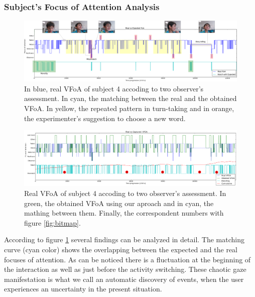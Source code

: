 \documentclass{sig-alternate}
\begin{document}
\subsubsection{Subject's Focus of Attention Analysis}

\begin{figure}
    \centering
    \includegraphics[width=1.8\columnwidth]{realExpected}
    \caption{\small In blue, real VFoA of subject 4 accoding to two observer's
    assessment. In cyan, the matching between the real and the obtained VFoA. In
    yellow, the repeated pattern in turn-taking and in orange, the experimenter's
    suggestion to choose a new word.}

    \label{fig:realExpected}
    
\end{figure}

\begin{figure}
    \centering
    \includegraphics[width=1.81\columnwidth]{realCaptured}
    \caption{\small Real VFoA of subject 4 accoding to two observer's
    assessment. In green, the obtained VFoA using our aproach and in cyan, the
    mathing between them. Finally, the correspondent numbers with figure \ref{fig:bitmap}.}

    \label{fig:realCaptured}
\end{figure}

According to figure \ref{fig:realExpected} several findings can be analyzed in
detail. The matching curve (cyan color) shows the overlapping between the
expected and the real focuses of attention. As can be noticed there is a
fluctuation at the beginning of the interaction as well as just before the
activity switching. These chaotic gaze manifestation is what we call an
automatic discovery of events, when the user experiences an uncertainty in the
present situation. 
\end{document}
